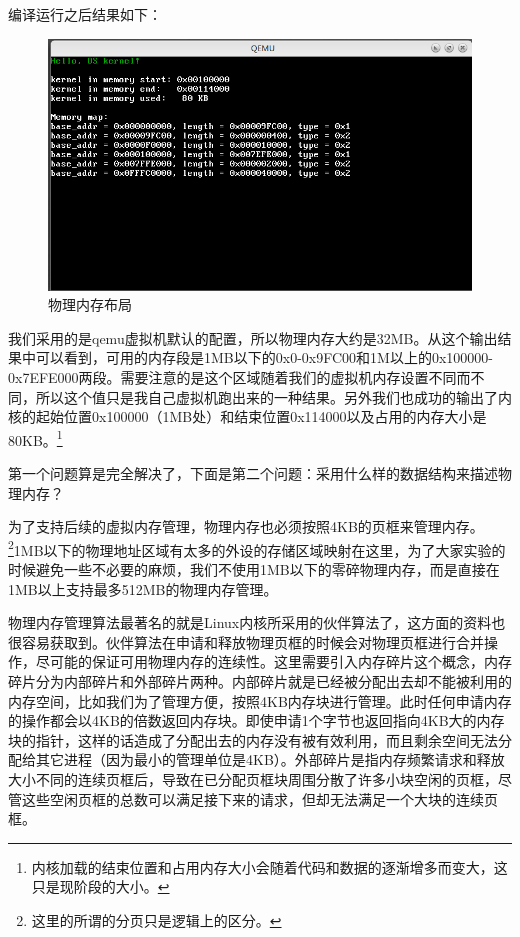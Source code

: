 \par 编译运行之后结果如下：

\begin{figure}[ht]
      \centering
      \includegraphics[scale=0.6]{picture/chapt9/PHY_MEM_MAP.png}
      \caption{物理内存布局}
\end{figure}

\par 我们采用的是qemu虚拟机默认的配置，所以物理内存大约是32MB。从这个输出结果中可以看到，可用的内存段是1MB以下的0x0-0x9FC00和1M以上的0x100000-0x7EFE000两段。需要注意的是这个区域随着我们的虚拟机内存设置不同而不同，所以这个值只是我自己虚拟机跑出来的一种结果。另外我们也成功的输出了内核的起始位置0x100000（1MB处）和结束位置0x114000以及占用的内存大小是80KB。\footnote{内核加载的结束位置和占用内存大小会随着代码和数据的逐渐增多而变大，这只是现阶段的大小。}

\par 第一个问题算是完全解决了，下面是第二个问题：采用什么样的数据结构来描述物理内存？

\par 为了支持后续的虚拟内存管理，物理内存也必须按照4KB的页框来管理内存。\footnote{这里的所谓的分页只是逻辑上的区分。}1MB以下的物理地址区域有太多的外设的存储区域映射在这里，为了大家实验的时候避免一些不必要的麻烦，我们不使用1MB以下的零碎物理内存，而是直接在1MB以上支持最多512MB的物理内存管理。

\par 物理内存管理算法最著名的就是Linux内核所采用的伙伴算法了，这方面的资料也很容易获取到。伙伴算法在申请和释放物理页框的时候会对物理页框进行合并操作，尽可能的保证可用物理内存的连续性。这里需要引入内存碎片这个概念，内存碎片分为内部碎片和外部碎片两种。内部碎片就是已经被分配出去却不能被利用的内存空间，比如我们为了管理方便，按照4KB内存块进行管理。此时任何申请内存的操作都会以4KB的倍数返回内存块。即使申请1个字节也返回指向4KB大的内存块的指针，这样的话造成了分配出去的内存没有被有效利用，而且剩余空间无法分配给其它进程（因为最小的管理单位是4KB）。外部碎片是指内存频繁请求和释放大小不同的连续页框后，导致在已分配页框块周围分散了许多小块空闲的页框，尽管这些空闲页框的总数可以满足接下来的请求，但却无法满足一个大块的连续页框。

